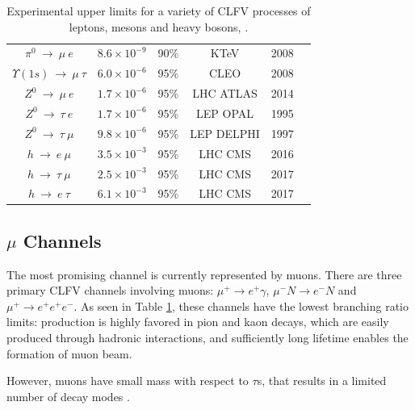 \begin{center}
\begin{table}[!h]
\begin{tabular}{c c c c c c}
$\pi^0 \ \rightarrow \ \mu \ e$ & $8.6 \times 10^{-9}$ & 90\% & KTeV & 2008 & \cite{KTeV:2007cvy}\\
$\Upsilon (1s) \ \rightarrow \ \mu \ \tau $ & $6.0 \times 10^{-6}$ & 95\% & CLEO & 2008 & \cite{Love_2008}\\
\hline
$Z^0 \ \rightarrow \ \mu \ e$ & $1.7 \times 10^{-6}$ & 95\% &  LHC ATLAS & 2014 & \cite{Aad_2014} \\
$Z^0 \ \rightarrow \ \tau \ e$ & $1.7 \times 10^{-6}$ & 95\% &  LEP OPAL & 1995 & \cite{akers}\\
$Z^0 \ \rightarrow \ \tau \ \mu$ & $9.8 \times 10^{-6}$ & 95\% &  LEP DELPHI & 1997 & \cite{abreu}\\
$h \ \rightarrow \ e \ \mu$ & $3.5 \times 10^{-3}$ & 95\% & LHC CMS & 2016 & \cite{PhysRevD.104.032013}\\
$h \ \rightarrow \ \tau  \ \mu$ & $2.5 \times 10^{-3}$ & 95\% & LHC CMS & 2017 & \cite{cms17}\\
$h \ \rightarrow \ e \ \tau$ & $6.1 \times 10^{-3}$ & 95\% & LHC CMS & 2017 & \cite{cms17}\\
\hline
\end{tabular}
\caption{Experimental upper limits for a variety of CLFV processes of leptons, mesons and heavy bosons, \cite{clfv_signorelli}.}
\label{tab:upperlimits}
\end{table}
\end{center}
\vspace{-15mm}
\subsection{$\mu$ Channels}
The most promising channel is currently represented by muons. 
There are three primary CLFV channels involving muons: 
$\mu^+ \rightarrow e^+ \gamma$, $\mu^- N \rightarrow e^- N$ and $\mu^+ \rightarrow e^+ e^+ e^-$. 
As seen in Table \ref{tab:upperlimits}, 
these channels have the lowest branching ratio limits: 
 production is highly favored in pion and kaon decays, 
which are easily produced through hadronic interactions, and  
 sufficiently long  lifetime enables the 
formation of  muon beam. 

However, muons have small mass with respect to $\tau$s, that results
in a limited number of decay modes . 

